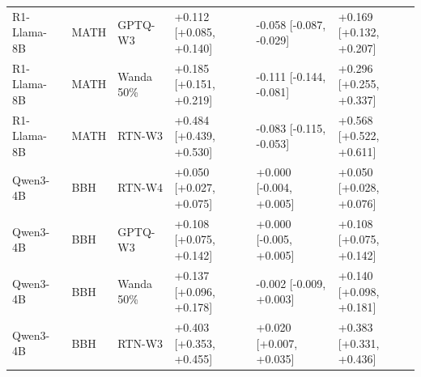 \begin{tabular}{llllll}
R1-Llama-8B & MATH & GPTQ-W3 & +0.112 [+0.085, +0.140] & -0.058 [-0.087, -0.029] & +0.169 [+0.132, +0.207] \\
R1-Llama-8B & MATH & Wanda 50\% & +0.185 [+0.151, +0.219] & -0.111 [-0.144, -0.081] & +0.296 [+0.255, +0.337] \\
R1-Llama-8B & MATH & RTN-W3 & +0.484 [+0.439, +0.530] & -0.083 [-0.115, -0.053] & +0.568 [+0.522, +0.611] \\
Qwen3-4B & BBH & RTN-W4 & +0.050 [+0.027, +0.075] & +0.000 [-0.004, +0.005] & +0.050 [+0.028, +0.076] \\
Qwen3-4B & BBH & GPTQ-W3 & +0.108 [+0.075, +0.142] & +0.000 [-0.005, +0.005] & +0.108 [+0.075, +0.142] \\
Qwen3-4B & BBH & Wanda 50\% & +0.137 [+0.096, +0.178] & -0.002 [-0.009, +0.003] & +0.140 [+0.098, +0.181] \\
Qwen3-4B & BBH & RTN-W3 & +0.403 [+0.353, +0.455] & +0.020 [+0.007, +0.035] & +0.383 [+0.331, +0.436] \\
\bottomrule
\end{tabular}
